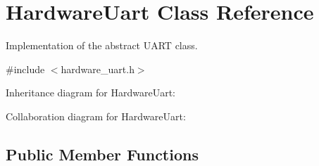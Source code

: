 \hypertarget{classHardwareUart}{}\section{Hardware\+Uart Class Reference}
\label{classHardwareUart}


Implementation of the abstract U\+A\+RT class.  




{\ttfamily \#include $<$hardware\+\_\+uart.\+h$>$}



Inheritance diagram for Hardware\+Uart\+:


Collaboration diagram for Hardware\+Uart\+:
\subsection*{Public Member Functions}
